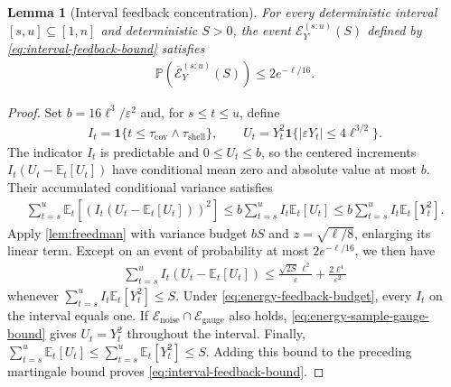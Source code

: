 \documentclass{article}
\newtheorem{lemma}[lemma]{Lemma}
\newcommand{\E}{\mathbb E}
\newcommand{\Pp}{\mathbb P}
\newcommand{\1}{\mathbf 1}
\newcommand{\eps}{\varepsilon}
\begin{document}
\begin{lemma}[Interval feedback concentration]
    \label{lem:interval-feedback-concentration}
    For every deterministic interval $[s,u]\subseteq[1,n]$ and deterministic $S>0$, the event $\mathcal E_Y^{(s:u)}(S)$ defined by \eqref{eq:interval-feedback-bound} satisfies
    \begin{align}
        \Pp\left(\overline{\mathcal E}_Y^{(s:u)}(S)\right)
        \leq2e^{-\ell/16}.
    \end{align}
\end{lemma}
\begin{proof}
    Set $b=16\ell^3/\eps^2$ and, for $s\leq t\leq u$, define
    \begin{align}
        I_t=\1\{t\leq\tau_{\mathrm{cov}}\wedge\tau_{\mathrm{shell}}\},
        \qquad U_t=Y_t^2\1\{|\eps Y_t|\leq4\ell^{3/2}\}.
    \end{align}
    The indicator $I_t$ is predictable and $0\leq U_t\leq b$, so the centered increments $I_t(U_t-\E_t[U_t])$ have conditional mean zero and absolute value at most $b$.
    Their accumulated conditional variance satisfies
    \begin{align}
        \sum_{t=s}^{u}\E_t\left[\left(I_t(U_t-\E_t[U_t])\right)^2\right]
        \leq b\sum_{t=s}^{u}I_t\E_t[U_t]
        \leq b\sum_{t=s}^{u}I_t\E_t[Y_t^2].
    \end{align}
    Apply \cref{lem:freedman} with variance budget $bS$ and $z=\sqrt{\ell/8}$, enlarging its linear term.
    Except on an event of probability at most $2e^{-\ell/16}$, we then have
    \begin{align}
        \sum_{t=s}^{u}I_t(U_t-\E_t[U_t])
        \leq\frac{\sqrt{2S}\,\ell^2}{\eps}+\frac{2\ell^4}{\eps^2}
    \end{align}
    whenever $\sum_{t=s}^{u}I_t\E_t[Y_t^2]\leq S$.
    Under \eqref{eq:energy-feedback-budget}, every $I_t$ on the interval equals one.
    If $\mathcal E_{\mathrm{noise}}\cap\mathcal E_{\mathrm{gauge}}$ also holds, \eqref{eq:energy-sample-gauge-bound} gives $U_t=Y_t^2$ throughout the interval.
    Finally, $\sum_{t=s}^{u}\E_t[U_t]\leq\sum_{t=s}^{u}\E_t[Y_t^2]\leq S$.
    Adding this bound to the preceding martingale bound proves \eqref{eq:interval-feedback-bound}.
\end{proof}
\end{document}
